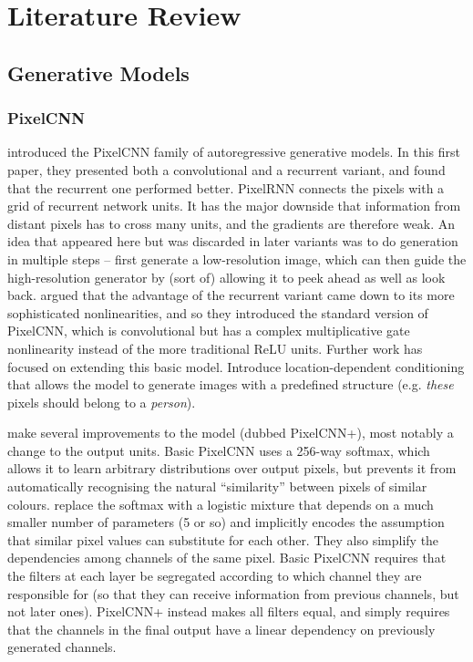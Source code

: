 \documentclass[10pt,a4paper]{article}
\newcommand{\nquote}[1]{``{#1}''}
\begin{document}
\section{Literature Review}

\subsection{Generative Models}

\subsubsection{PixelCNN}
\citet{pixelcnn1} introduced the PixelCNN family of autoregressive generative models. In this first paper, they presented both a convolutional and a recurrent variant, and found that the recurrent one performed better. PixelRNN connects the pixels with a grid of recurrent network units. It has the major downside that information from distant pixels has to cross many units, and the gradients are therefore weak. An idea that appeared here but was discarded in later variants was to do generation in multiple steps -- first generate a low-resolution image, which can then guide the high-resolution generator by (sort of) allowing it to peek ahead as well as look back. \citet{pixelcnn2} argued that the advantage of the recurrent variant came down to its more sophisticated nonlinearities, and so they introduced the standard version of PixelCNN, which is convolutional but has a complex multiplicative gate nonlinearity instead of the more traditional ReLU units. Further work has focused on extending this basic model. \citet{pixelcnn3} Introduce location-dependent conditioning that allows the model to generate images with a predefined structure (e.g. \emph{these} pixels should belong to a \emph{person}).

\citet{pixelcnn++} make several improvements to the model (dubbed PixelCNN+), most notably a change to the output units. Basic PixelCNN uses a 256-way softmax, which allows it to learn arbitrary distributions over output pixels, but prevents it from automatically recognising the natural \nquote{similarity} between pixels of similar colours. \citet{pixelcnn++} replace the softmax with a logistic mixture that depends on a much smaller number of parameters (5 or so) and implicitly encodes the assumption that similar pixel values can substitute for each other. They also simplify the dependencies among channels of the same pixel. Basic PixelCNN requires that the filters at each layer be segregated according to which channel they are responsible for (so that they can receive information from previous channels, but not later ones). PixelCNN+ instead makes all filters equal, and simply requires that the channels in the final output have a linear dependency on previously generated channels.
\end{document}
